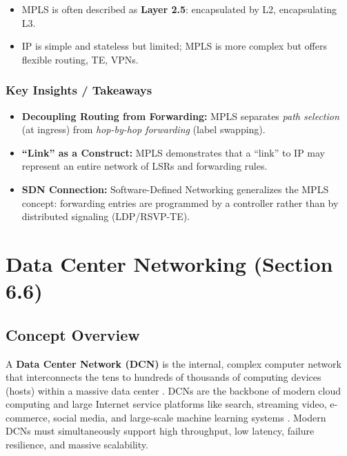 \documentclass[12pt]{article}
\begin{document}
\begin{itemize}
    \item MPLS is often described as \textbf{Layer 2.5}: encapsulated by L2, encapsulating L3.
    \item IP is simple and stateless but limited; MPLS is more complex but offers flexible routing, TE, VPNs.
\end{itemize}

\subsubsection{Key Insights / Takeaways}

\begin{itemize}
    \item \textbf{Decoupling Routing from Forwarding:}
          MPLS separates \emph{path selection} (at ingress) from \emph{hop-by-hop forwarding} (label swapping).
    \item \textbf{``Link'' as a Construct:}
          MPLS demonstrates that a “link” to IP may represent an entire network of LSRs and forwarding rules.
    \item \textbf{SDN Connection:}
          Software-Defined Networking generalizes the MPLS concept: forwarding entries are programmed by a controller rather than by distributed signaling (LDP/RSVP-TE).
\end{itemize}

\section{Data Center Networking (Section 6.6)}

\subsection{Concept Overview}

A \textbf{Data Center Network (DCN)} is the internal, complex computer network that interconnects the tens to hundreds of thousands of computing devices (hosts) within a massive data center \cite{13885}. DCNs are the backbone of modern cloud computing and large Internet service platforms like search, streaming video, e-commerce, social media, and large-scale machine learning systems \cite{13886}. Modern DCNs must simultaneously support high throughput, low latency, failure resilience, and massive scalability.
\end{document}

